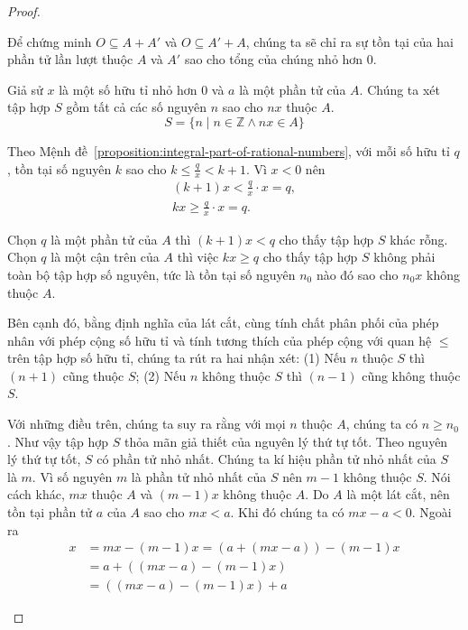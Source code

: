 \begin{proof}
\begin{enumerate}[label={(\roman*)}]
              Để chứng minh $O\subseteq A + A'$ và $O\subseteq A' + A$, chúng ta sẽ chỉ ra sự tồn tại của hai phần tử lần lượt thuộc $A$ và $A'$ sao cho tổng của chúng nhỏ hơn $0$.

              Giả sử $x$ là một số hữu tỉ nhỏ hơn $0$ và $a$ là một phần tử của $A$. Chúng ta xét tập hợp $S$ gồm tất cả các số nguyên $n$ sao cho $nx$ thuộc $A$.
              \[
                  S = \{ n \mid n\in\mathbb{Z} \wedge nx\in A \}
              \]

              Theo Mệnh đề~\ref{proposition:integral-part-of-rational-numbers}, với mỗi số hữu tỉ $q$, tồn tại số nguyên $k$ sao cho $k\leq \frac{q}{x} < k + 1$. Vì $x < 0$ nên
              \[
                  \begin{split}
                      (k + 1)x < \frac{q}{x}\cdot x = q, \\
                      kx \geq \frac{q}{x}\cdot x = q.
                  \end{split}
              \]

              Chọn $q$ là một phần tử của $A$ thì $(k + 1)x < q$ cho thấy tập hợp $S$ khác rỗng. Chọn $q$ là một cận trên của $A$ thì việc $kx\geq q$ cho thấy tập hợp $S$ không phải toàn bộ tập hợp số nguyên, tức là tồn tại số nguyên $n_{0}$ nào đó sao cho $n_{0}x$ không thuộc $A$.

              Bên cạnh đó, bằng định nghĩa của lát cắt, cùng tính chất phân phối của phép nhân với phép cộng số hữu tỉ và tính tương thích của phép cộng với quan hệ $\leq$ trên tập hợp số hữu tỉ, chúng ta rút ra hai nhận xét: (1) Nếu $n$ thuộc $S$ thì $(n + 1)$ cũng thuộc $S$; (2) Nếu $n$ không thuộc $S$ thì $(n - 1)$ cũng không thuộc $S$.

              Với những điều trên, chúng ta suy ra rằng với mọi $n$ thuộc $A$, chúng ta có $n\geq n_{0}$. Như vậy tập hợp $S$ thỏa mãn giả thiết của nguyên lý thứ tự tốt. Theo nguyên lý thứ tự tốt, $S$ có phần tử nhỏ nhất. Chúng ta kí hiệu phần tử nhỏ nhất của $S$ là $m$. Vì số nguyên $m$ là phần tử nhỏ nhất của $S$ nên $m - 1$ không thuộc $S$. Nói cách khác, $mx$ thuộc $A$ và $(m - 1)x$ không thuộc $A$. Do $A$ là một lát cắt, nên tồn tại phần tử $a$ của $A$ sao cho $mx < a$. Khi đó chúng ta có $mx - a < 0$. Ngoài ra
              \begin{align*}
                  x & = mx - (m-1)x = (a + (mx - a)) - (m-1)x \\
                    & = a + ((mx-a) - (m-1)x)                 \\
                    & = ((mx - a) - (m-1)x) + a
              \end{align*}


\end{enumerate}
\end{proof}
